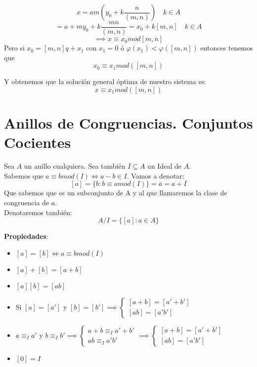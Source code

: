 \documentclass[11pt, a4paper, titlepage]{article}
\makeatletter
\renewenvironment{proof}[1][\proofname] {\vspace{-15pt}\par\pushQED{\qed}\normalfont\topsep6\p@\@plus6\p@\relax\trivlist\item[\hskip\labelsep\it#1\@addpunct{.}]\ignorespaces}{\popQED\endtrivlist\@endpefalse}
\theoremstyle{theorem-style}
\theoremstyle{definition-style}
\theoremstyle{remark-style}
\theoremstyle{example-style}
\makeatother
\begin{document}
\[
x = am(y_0 +  k\frac{n}{(m,n)}) \quad k \in A
\]
\[
 = a+my_0 + k \frac{mn}{(m,n)} = x_0 +k[m,n] \quad k \in A
\]
\[
\implies x \equiv x_0 mod [m,n]
\]
Pero si $x_0 = [m,n]q + x_1$ con $x_1 = 0 $ ó $\varphi(x_1) < \varphi([m,n])$ entonces tenemos que $$x_0 \equiv x_1 mod([m,n])$$

Y obtenemos que la solución general óptima de nuestro sistema es:
\[
x \equiv x_1 mod([m,n])
\]

\section{Anillos de Congruencias. Conjuntos Cocientes}

Sea $A$ un anillo cualquiera. Sea también $I \subseteq A$ un Ideal de $A$.\\
Sabemos que $a \equiv b mod(I) \iff a-b \in I$. Vamos a denotar:
\[
[a] = \{ b: b\equiv a mod(I)\} = \bar{a} = a + I
\]
Que sabemos que es un subconjunto de A y al que llamaremos la clase de congruencia de $a$.\\
Denotaremos también:
\[
 A/I = \{[a]: a \in A\}
\]


\textbf{Propiedades}:\\
\begin{itemize}
	\item $  [a]=[b] \iff a \equiv b mod (I) $
	\item $[a] + [b] = [a+b]$
	\item $[a][b] = [ab] $
	\item Si $[a] = [a']$ y $[b] = [b'] \implies \begin{cases}
	[a+b] = [a' +b']\\
	[ab] = [a'b']
\end{cases}$\\

\begin{proof}
	$a\equiv_I a'$ y $b \equiv_I b' \implies \begin{cases}
	a+b \equiv_I a'+b'\\
	ab \equiv_I a'b'
\end{cases}\implies \begin{cases}
	[a+b] = [a'+b']\\
	[ab] = [a'b']
\end{cases}$
\end{proof}
	\item $[0] = I$
\end{itemize}
\end{document}
